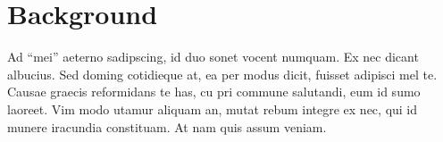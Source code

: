 \section{Background}
\label{sec:bg}

Ad “mei” aeterno sadipscing, id duo sonet vocent numquam.
Ex nec dicant albucius. Sed doming cotidieque at, ea per modus dicit, fuisset adipisci mel te.
Causae graecis reformidans te has, cu pri commune salutandi, eum id sumo laoreet.
Vim modo utamur aliquam an, mutat rebum integre ex nec, qui id munere iracundia constituam.
At nam quis assum veniam.	

